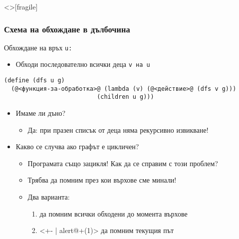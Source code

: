 \documentclass[alsotrans,beameroptions={aspectratio=169}]{beamerswitch}
\begin{document}
\begin{frame}<>[fragile]
  \frametitle{Схема на обхождане в дълбочина}

  Обхождане на връх \tt u:
  \begin{itemize}
  \item Обходи последователно всички деца \tt v на \tt u
  \end{itemize}
  \pause
{\small
\begin{lstlisting}
(define (dfs u g)
  (@<функция-за-обработка>@ (lambda (v) (@<действие>@ (dfs v g)))
                          (children u g)))
\end{lstlisting}
}
  \pause
  \begin{itemize}[<+->]
  \item \alert{Имаме ли дъно?}
    \begin{itemize}
    \item Да: при празен списък от деца няма рекурсивно извикване!
    \end{itemize}
  \item \alert{Какво се случва ако графът е цикличен?}
    \begin{itemize}
    \item Програмата също зацикля! Как да се справим с този проблем?
    \item Трябва да помним през кои върхове сме минали!
    \item Два варианта:
      \begin{enumerate}
      \item да помним всички обходени до момента върхове
      \item<+- | alert@+(1)> да помним текущия път
      \end{enumerate}
    \end{itemize}
  \end{itemize}
\end{frame}
\end{document}
